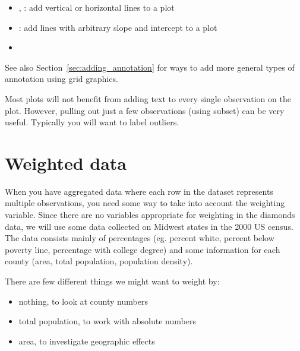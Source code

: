 \begin{itemize}
	\item {}, : add vertical or horizontal lines to a plot
	\item {}: add lines with arbitrary slope and intercept to a plot
	\item {}
\end{itemize}

See also Section~\ref{sec:adding_annotation} for ways to add more general types of annotation using grid graphics.

Most plots will not benefit from adding text to every single observation on the plot.  However, pulling out just a few observations (using subset) can be very useful.  Typically you will want to label outliers.



\section{Weighted data}
\label{sec:weighting}


When you have aggregated data where each row in the dataset represents multiple observations, you need some way to take into account the weighting variable.  Since there are no variables appropriate for weighting in the diamonds data, we will use some data collected on Midwest states in the 2000 US census.  The data consists mainly of percentages (eg. percent white, percent below poverty line, percentage with college degree) and some information for each county (area, total population, population density).

There are few different things we might want to weight by: 

\begin{itemize}
	\item nothing, to look at county numbers
	\item total population, to work with absolute numbers
	\item area, to investigate geographic effects
\end{itemize}

